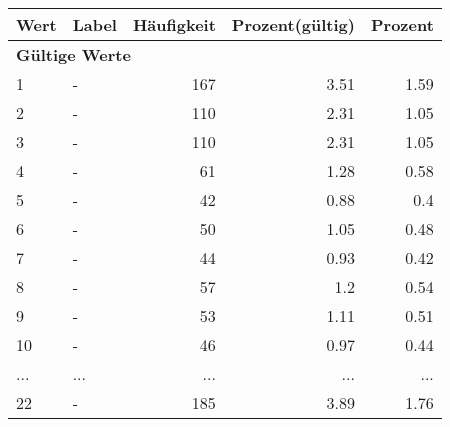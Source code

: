      \begin{longtable}{lXrrr}
     \toprule
     \textbf{Wert} & \textbf{Label} & \textbf{Häufigkeit} & \textbf{Prozent(gültig)} & \textbf{Prozent} \\
     \endhead
     \midrule
     \multicolumn{5}{l}{\textbf{Gültige Werte}}\\
        1 & \multicolumn{1}{X}{-} & %
          \num{167} &
          \num[round-mode=places,round-precision=2]{3,51} &
          \num[round-mode=places,round-precision=2]{1,59} \\
        2 & \multicolumn{1}{X}{-} & %
          \num{110} &
          \num[round-mode=places,round-precision=2]{2,31} &
          \num[round-mode=places,round-precision=2]{1,05} \\
        3 & \multicolumn{1}{X}{-} & %
          \num{110} &
          \num[round-mode=places,round-precision=2]{2,31} &
          \num[round-mode=places,round-precision=2]{1,05} \\
        4 & \multicolumn{1}{X}{-} & %
          \num{61} &
          \num[round-mode=places,round-precision=2]{1,28} &
          \num[round-mode=places,round-precision=2]{0,58} \\
        5 & \multicolumn{1}{X}{-} & %
          \num{42} &
          \num[round-mode=places,round-precision=2]{0,88} &
          \num[round-mode=places,round-precision=2]{0,4} \\
        6 & \multicolumn{1}{X}{-} & %
          \num{50} &
          \num[round-mode=places,round-precision=2]{1,05} &
          \num[round-mode=places,round-precision=2]{0,48} \\
        7 & \multicolumn{1}{X}{-} & %
          \num{44} &
          \num[round-mode=places,round-precision=2]{0,93} &
          \num[round-mode=places,round-precision=2]{0,42} \\
        8 & \multicolumn{1}{X}{-} & %
          \num{57} &
          \num[round-mode=places,round-precision=2]{1,2} &
          \num[round-mode=places,round-precision=2]{0,54} \\
        9 & \multicolumn{1}{X}{-} & %
          \num{53} &
          \num[round-mode=places,round-precision=2]{1,11} &
          \num[round-mode=places,round-precision=2]{0,51} \\
        10 & \multicolumn{1}{X}{-} & %
          \num{46} &
          \num[round-mode=places,round-precision=2]{0,97} &
          \num[round-mode=places,round-precision=2]{0,44} \\
       ... & ... & ... & ... & ... \\
        22 & \multicolumn{1}{X}{-} & %
          \num{185} &
          \num[round-mode=places,round-precision=2]{3,89} &
          \num[round-mode=places,round-precision=2]{1,76} \\


\end{longtable}
